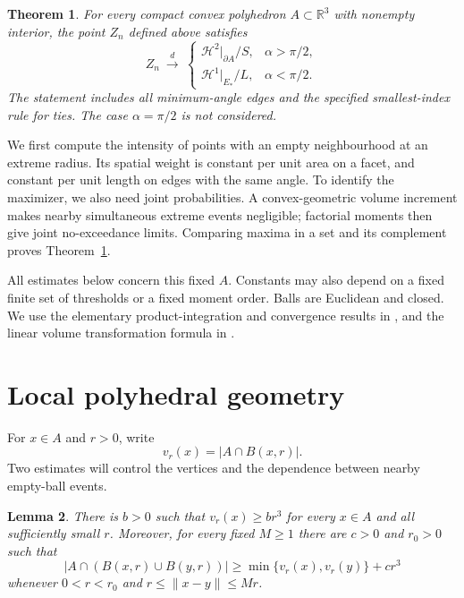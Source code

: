 \documentclass[11pt]{article}
\newtheorem{theorem}{Theorem}
\newtheorem{lemma}[theorem]{Lemma}
\newcommand{\HH}{\mathcal H}
\newcommand{\norm}[1]{\lVert #1\rVert}
\begin{document}
\begin{theorem}\label{thm:location}
For every compact convex polyhedron $A\subset\mathbb R^3$ with nonempty
interior, the point $Z_n$ defined above satisfies
\[
 Z_n\ \xrightarrow{\ d\ }\
 \begin{cases}
   \HH^2|_{\partial A}/S,&\alpha>\pi/2,\\[2mm]
   \HH^1|_{E_*}/L,&\alpha<\pi/2.
 \end{cases}
\]
The statement includes all minimum-angle edges and the specified
smallest-index rule for ties. The case $\alpha=\pi/2$ is not considered.
\end{theorem}

We first compute the intensity of points with an empty neighbourhood at an
extreme radius. Its spatial weight is constant per unit area on a facet,
and constant per unit length on edges with the same angle. To identify the
maximizer, we also need joint probabilities. A convex-geometric volume
increment makes nearby simultaneous extreme events negligible; factorial
moments then give joint no-exceedance limits. Comparing maxima in a set and
its complement proves Theorem~\ref{thm:location}.

All estimates below concern this fixed $A$. Constants may also depend on a
fixed finite set of thresholds or a fixed moment order. Balls are Euclidean
and closed. We use the elementary product-integration and convergence
results in \cite[Sections~1.5, 1.7 and 3.10]{Durrett}, and the linear
volume transformation formula in \cite[Section~2.8]{Hunter}.

\section{Local polyhedral geometry}

For $x\in A$ and $r>0$, write
\[
 v_r(x)=|A\cap B(x,r)|.
\]
Two estimates will control the vertices and the dependence between nearby
empty-ball events.

\begin{lemma}\label{lem:union}
There is $b>0$ such that $v_r(x)\geq br^3$ for every $x\in A$ and all
sufficiently small $r$. Moreover, for every fixed $M\geq1$ there are
$c>0$ and $r_0>0$ such that
\begin{equation}\label{eq:union}
 |A\cap(B(x,r)\cup B(y,r))|
 \geq\min\{v_r(x),v_r(y)\}+cr^3
\end{equation}
whenever $0<r<r_0$ and $r\leq\norm{x-y}\leq Mr$.
\end{lemma}
\end{document}
